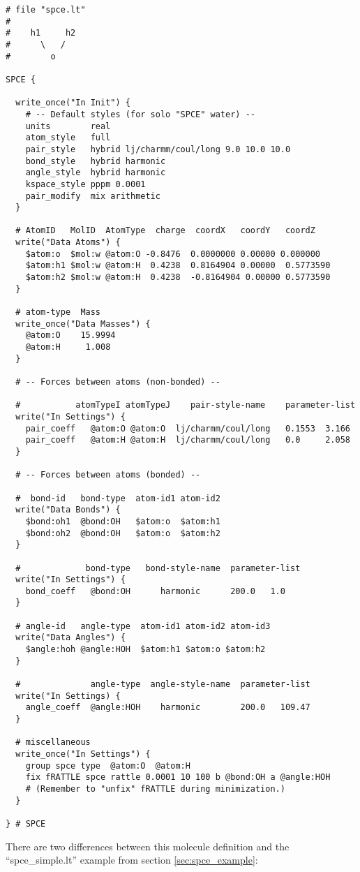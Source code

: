 \documentclass[11pt]{article}
\begin{document}
\begin{verbatim}
# file "spce.lt" 
#
#    h1     h2
#      \   /
#        o

SPCE {

  write_once("In Init") {
    # -- Default styles (for solo "SPCE" water) --
    units        real
    atom_style   full
    pair_style   hybrid lj/charmm/coul/long 9.0 10.0 10.0
    bond_style   hybrid harmonic
    angle_style  hybrid harmonic
    kspace_style pppm 0.0001
    pair_modify  mix arithmetic
  }

  # AtomID   MolID  AtomType  charge  coordX   coordY   coordZ
  write("Data Atoms") {
    $atom:o  $mol:w @atom:O -0.8476  0.0000000 0.00000 0.000000
    $atom:h1 $mol:w @atom:H  0.4238  0.8164904 0.00000  0.5773590
    $atom:h2 $mol:w @atom:H  0.4238  -0.8164904 0.00000 0.5773590
  }

  # atom-type  Mass
  write_once("Data Masses") {
    @atom:O    15.9994
    @atom:H     1.008
  }

  # -- Forces between atoms (non-bonded) --

  #           atomTypeI atomTypeJ    pair-style-name    parameter-list
  write("In Settings") {
    pair_coeff   @atom:O @atom:O  lj/charmm/coul/long   0.1553  3.166 
    pair_coeff   @atom:H @atom:H  lj/charmm/coul/long   0.0     2.058
  }

  # -- Forces between atoms (bonded) --

  #  bond-id   bond-type  atom-id1 atom-id2
  write("Data Bonds") {
    $bond:oh1  @bond:OH   $atom:o  $atom:h1
    $bond:oh2  @bond:OH   $atom:o  $atom:h2
  }

  #             bond-type   bond-style-name  parameter-list
  write("In Settings") {
    bond_coeff   @bond:OH      harmonic      200.0   1.0 
  }

  # angle-id   angle-type  atom-id1 atom-id2 atom-id3
  write("Data Angles") {
    $angle:hoh @angle:HOH  $atom:h1 $atom:o $atom:h2
  }

  #              angle-type  angle-style-name  parameter-list
  write("In Settings) {
    angle_coeff  @angle:HOH    harmonic        200.0   109.47
  }

  # miscellaneous
  write_once("In Settings") {
    group spce type  @atom:O  @atom:H
    fix fRATTLE spce rattle 0.0001 10 100 b @bond:OH a @angle:HOH
    # (Remember to "unfix" fRATTLE during minimization.)
  }

} # SPCE
\end{verbatim}
There are two differences between this molecule definition
and the ``spce\_simple.lt'' example from section
\ref{sec:spce_example}:
\end{document}

